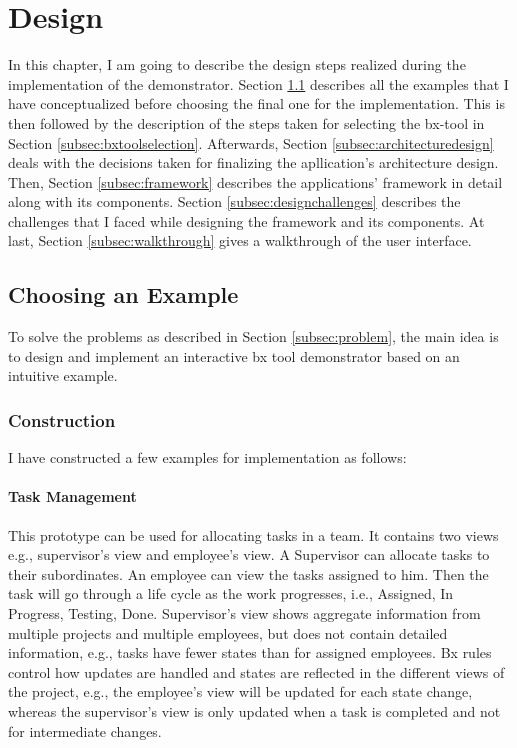 \section{Design}\label{sec:design}
In this chapter, I am going to describe the design steps realized during the implementation of the demonstrator. Section \ref{subsec:exampleforimplementation} describes all the examples that I have conceptualized before choosing the final one for the implementation. This is then followed by the description of the steps taken for selecting the bx-tool in Section \ref{subsec:bxtoolselection}. Afterwards, Section \ref{subsec:architecturedesign} deals with the decisions taken for finalizing the apllication's architecture design. Then, Section \ref{subsec:framework} describes the applications' framework in detail along with its components.
Section \ref{subsec:designchallenges} describes the challenges that I faced while designing the framework and its components. At last, Section \ref{subsec:walkthrough} gives a walkthrough of the user interface.
\subsection{Choosing an Example}\label{subsec:exampleforimplementation}
To solve the problems as described in Section \ref{subsec:problem}, the main idea is to design and implement an interactive bx tool demonstrator based on an intuitive example.
\subsubsection{Construction}\label{subsubsec:exampleconstruction}
I have constructed a few examples for implementation as follows:
\paragraph{Task Management} This prototype can be used for allocating tasks in a team. It contains two views e.g., supervisor's view and employee's view. A Supervisor can allocate tasks to their subordinates. An employee can view the tasks assigned to him. Then the task will go through a life cycle as the work progresses, i.e., Assigned, In Progress, Testing, Done. Supervisor's view shows aggregate information from multiple projects and multiple employees, but does not contain detailed information, e.g., tasks have fewer states than for assigned employees. Bx rules control how updates are handled and states are reflected in the different views of the project, e.g., the employee's view will be updated for each state change, whereas the supervisor's view is only updated when a task is completed and not for intermediate changes.


